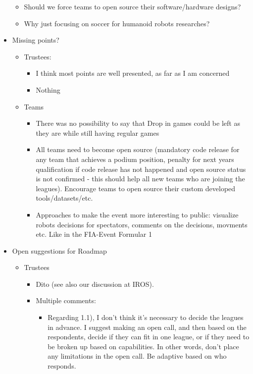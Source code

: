\documentclass{article}
\begin{document}
\begin{itemize}
\begin{itemize}
       \item Should we force teams to open source their software/hardware designs?
       \item Why just focusing on soccer for humanoid robots researches?
\end{itemize}
   \item Missing points?
   \begin{itemize} 
       \item Trustees:
       \begin{itemize} 
           \item I think most points are well presented, as far as I am concerned
           \item Nothing
   \end{itemize}
       \item Teams
       \begin{itemize} 
           \item There was no possibility to say that Drop in games could be left as they are while still having regular games
           \item All teams need to become open source (mandatory code release for any team that achieves a podium position, penalty for next years qualification if code release has not happened and open source status is not confirmed - this should help all new teams who are joining the leagues). Encourage teams to open source their custom developed tools/datasets/etc. 
           \item Approaches to make the event more interesting to public: visualize robots decisions for spectators, comments on the decisions, movments etc. Like in the FIA-Event Formular 1
\end{itemize}
\end{itemize}
   \item Open suggestions for Roadmap
   \begin{itemize} 
       \item Trustees
       \begin{itemize} 
           \item Dito (see also our discussion at IROS).
           \item Multiple comments:
           \begin{itemize} 
               \item Regarding 1.1), I don't think it's necessary to decide the leagues in advance.  I suggest making an open call, and then based on the respondents, decide if they can fit in one league, or if they need to be broken up based on capabilities.  In other words, don't place any limitations in the open call.  Be adaptive based on who responds.

\end{itemize}
\end{itemize}
\end{itemize}
\end{itemize}
\end{document}
